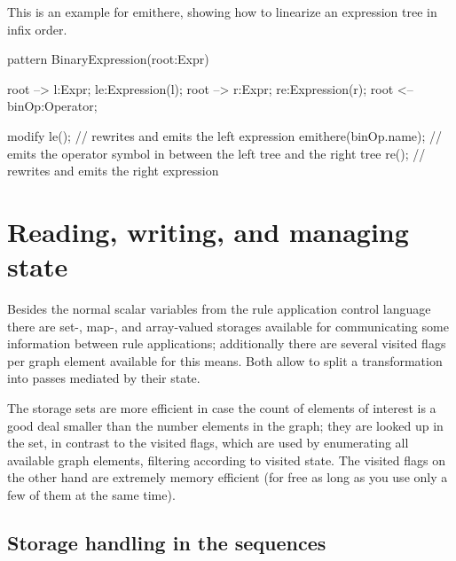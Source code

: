 \begin{example}
	This is an example for emithere, showing how to linearize an expression tree in infix order.
	\begin{grgen}
pattern BinaryExpression(root:Expr)
{
  root --> l:Expr; le:Expression(l);
  root --> r:Expr; re:Expression(r);
  root <-- binOp:Operator;
  
  modify {
    le(); // rewrites and emits the left expression
    emithere(binOp.name); // emits the operator symbol in between the left tree and the right tree
    re(); // rewrites and emits the right expression
  }
}  
	\end{grgen}
\end{example}



\section{Reading, writing, and managing state}

Besides the normal scalar variables from the rule application control language there are set-, map-, and array-valued storages available for communicating some information between rule applications;
additionally there are several visited flags per graph element available for this means.
Both allow to split a transformation into passes mediated by their state.

\begin{note}
The storage sets are more efficient in case the count of elements of interest is a good deal smaller than the number elements in the graph; they are looked up in the set, in contrast to the visited flags, which are used by enumerating all available graph elements, filtering according to visited state.
The visited flags on the other hand are extremely memory efficient (for free as long as you use only a few of them at the same time).
\end{note}

\subsection{Storage handling in the sequences}\label{sec:storages}

